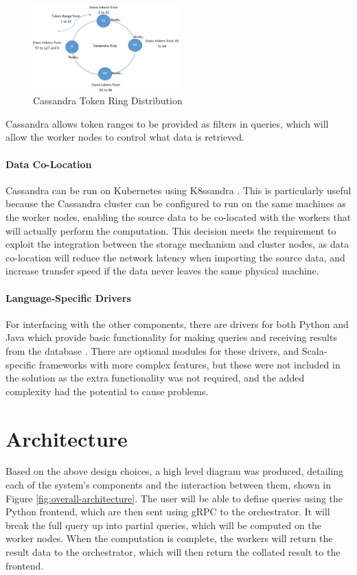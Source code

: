 \begin{figure}[h]
	\centering
	\includegraphics[width=0.5\textwidth]{chapters/diagrams/design/cassandra-token-distribution}
	\caption{Cassandra Token Ring Distribution \protect\cite{khatibi2019dynamic}}
	\label{fig:cassandra-token-distribution}
\end{figure}

Cassandra allows token ranges to be provided as filters in queries, which will allow the worker nodes to control what data is retrieved.

\paragraph{Data Co-Location} Cassandra can be run on Kubernetes using K8ssandra \cite{k8ssandra}. This is particularly useful because the Cassandra cluster can be configured to run on the same machines as the worker nodes, enabling the source data to be co-located with the workers that will actually perform the computation. This decision meets the requirement to exploit the integration between the storage mechanism and cluster nodes, as data co-location will reduce the network latency when importing the source data, and increase transfer speed if the data never leaves the same physical machine. 

\paragraph{Language-Specific Drivers} For interfacing with the other components, there are drivers for both Python and Java  which provide basic functionality for making queries and receiving results from the database \cite{datastaxjavadriver, datastaxpythondriver}. There are optional modules for these drivers, and Scala-specific frameworks with more complex features, but these were not included in the solution as the extra functionality was not required, and the added complexity had the potential to cause problems. 

\section{Architecture}\label{sec:architecture}
Based on the above design choices, a high level diagram was produced, detailing each of the system's components and the interaction between them, shown in Figure \ref{fig:overall-architecture}. The user will be able to define queries using the Python frontend, which are then sent using gRPC to the orchestrator. It will break the full query up into partial queries, which will be computed on the worker nodes. When the computation is complete, the workers will return the result data to the orchestrator, which will then return the collated result to the frontend.

